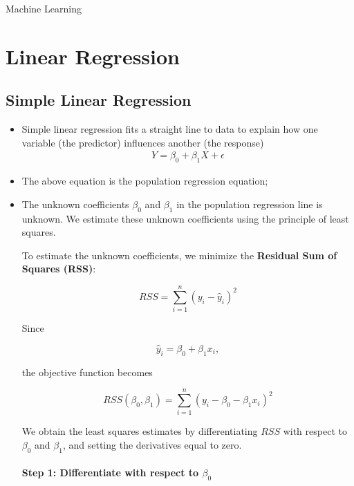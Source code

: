 \documentclass[10pt,a4paper]{article}
\newcommand{\NoteTitle}{Machine Learning}
\newcommand{\NoteAuthor}{Thomaskutty Reji}
\begin{document}
\begin{titlepage}
  \vspace*{0.25\textheight}
  {\LARGE \textcolor{tocblue}{\NoteTitle}}\par
  \author{\NoteAuthor}
  \date{}
\end{titlepage}

\label{toc}
\tableofcontents
\newpage

	\section{Linear Regression}
	\subsection{Simple Linear Regression}
	\begin{itemize}
		\item Simple linear regression fits a straight line to data to explain how one variable (the predictor) influences another (the response)
	\begin{align*}
				Y= \beta_0 + \beta_1 X + \epsilon
	\end{align*}

		\item The above equation is the population regression equation;

		\item The unknown coefficients $\beta_0$ and $\beta_1$ in the population regression line is unknown. We estimate these unknown coefficients using the principle of least squares.


	
	To estimate the unknown coefficients, we minimize the \textbf{Residual Sum of Squares (RSS)}:
	
	\[
	RSS = \sum_{i=1}^{n} (y_i - \hat{y}_i)^2
	\]
	
	Since
	
	\[
	\hat{y}_i = \beta_0 + \beta_1 x_i,
	\]
	
	the objective function becomes
	
	\[
	RSS(\beta_0,\beta_1)
	=
	\sum_{i=1}^{n} (y_i - \beta_0 - \beta_1 x_i)^2
	\]
	
	We obtain the least squares estimates by differentiating \(RSS\) with respect to
	\(\beta_0\) and \(\beta_1\), and setting the derivatives equal to zero.
	
	\paragraph{Step 1: Differentiate with respect to \(\beta_0\)}
	

\end{itemize}
\end{document}
